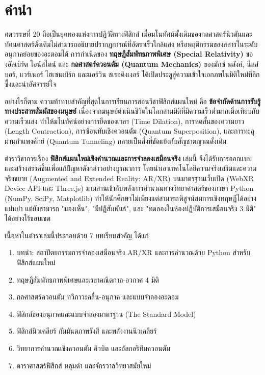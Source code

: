 \chapter*{คำนำ}

ศตวรรษที่ 20 ถือเป็นยุคทองแห่งการปฏิวัติทางฟิสิกส์ เมื่อมโนทัศน์ดั้งเดิมของกลศาสตร์นิวตันและทัศนศาสตร์ดั้งเดิมไม่สามารถอธิบายปรากฏการณ์ที่อัตราเร็วใกล้แสง หรือพฤติกรรมของสสารในระดับอนุภาคย่อยของอะตอมได้ การกำเนิดของ \textbf{ทฤษฎีสัมพัทธภาพพิเศษ (Special Relativity)} ของอัลเบิร์ต ไอน์สไตน์ และ \textbf{กลศาสตร์ควอนตัม (Quantum Mechanics)} ของมักซ์ พลังค์, นีลส์ บอร์, แวร์เนอร์ ไฮเซนเบิร์ก และแอร์วิน ชเรอดิงเงอร์ ได้เปิดประตูสู่ความเข้าใจเอกภพในมิติใหม่ที่ลึกซึ้งและน่าอัศจรรย์ใจ

อย่างไรก็ตาม ความท้าทายสำคัญที่สุดในการเรียนการสอนวิชาฟิสิกส์แผนใหม่ คือ \textbf{ข้อจำกัดด้านการรับรู้ทางประสาทสัมผัสของมนุษย์} เนื่องจากมนุษย์ดำเนินชีวิตในโลกสามมิติที่มีความเร็วต่ำมากเมื่อเทียบกับความเร็วแสง ทำให้มโนทัศน์อย่างการยืดของเวลา (Time Dilation), การหดสั้นของความยาว (Length Contraction), การซ้อนทับเชิงควอนตัม (Quantum Superposition), และการทะลุผ่านกำแพงศักย์ (Quantum Tunneling) กลายเป็นสิ่งที่ขัดแย้งกับสัญชาตญาณดั้งเดิม

ตำราวิชาการเรื่อง \textbf{ฟิสิกส์แผนใหม่เชิงคำนวณและการจำลองเสมือนจริง} เล่มนี้ จึงได้รับการออกแบบและสร้างสรรค์ขึ้นเพื่อแก้ปัญหาดังกล่าวอย่างบูรณาการ โดยนำเอาเทคโนโลยีความจริงเสริมและความจริงขยาย (Augmented and Extended Reality: AR/XR) บนมาตรฐานเว็บเปิด (WebXR Device API และ Three.js) มาผสานเข้ากับพลังการคำนวณทางวิทยาศาสตร์ของภาษา Python (NumPy, SciPy, Matplotlib) ทำให้นักศึกษาไม่เพียงแต่สามารถพิสูจน์สมการเชิงทฤษฎีได้อย่างแม่นยำ แต่ยังสามารถ "มองเห็น", "มีปฏิสัมพันธ์", และ "ทดลองในห้องปฏิบัติการเสมือนจริง 3 มิติ" ได้อย่างไร้ขอบเขต

เนื้อหาในตำราเล่มนี้ประกอบด้วย 7 บทเรียนสำคัญ ได้แก่
\begin{enumerate}
    \item บทนำ: สถาปัตยกรรมการจำลองเสมือนจริง AR/XR และการคำนวณด้วย Python สำหรับฟิสิกส์แผนใหม่
    \item ทฤษฎีสัมพัทธภาพพิเศษและเรขาคณิตกาล-อวกาศ 4 มิติ
    \item กลศาสตร์ควอนตัม ทวิภาวะคลื่น-อนุภาค และแบบจำลองอะตอม
    \item ฟิสิกส์ของอนุภาคและแบบจำลองมาตรฐาน (The Standard Model)
    \item ฟิสิกส์นิวเคลียร์ กัมมันตภาพรังสี และพลังงานนิวเคลียร์
    \item วิทยาการคำนวณเชิงควอนตัม คิวบิต และอัลกอริทึมควอนตัม
    \item ดาราศาสตร์ฟิสิกส์ หลุมดำ และจักรวาลวิทยาสมัยใหม่
\end{enumerate}

